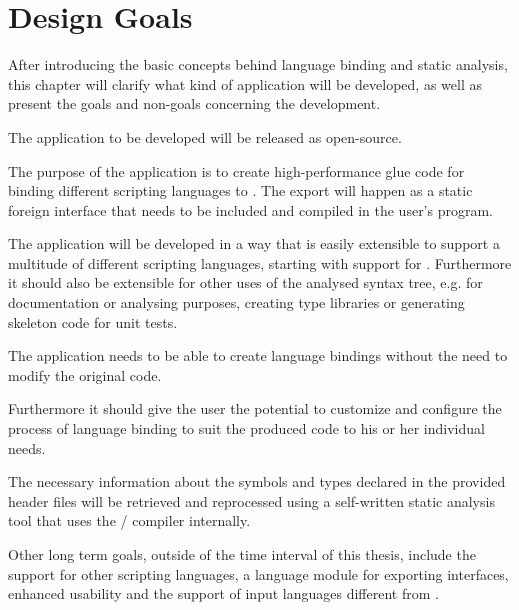\chapter{Design Goals}
\label{chap:DesignGoals}

After introducing the basic concepts behind language binding and static analysis, this chapter will clarify what kind of application will be developed, as well as present the goals and non-goals concerning the development.

The application to be developed will be released as open-source.

The purpose of the application is to create high-performance glue code for binding different scripting languages to . The export will happen as a static foreign interface that needs to be included and compiled in the user's program.

The application will be developed in a way that is easily extensible to support a multitude of different scripting languages, starting with support for . Furthermore it should also be extensible for other uses of the analysed  syntax tree, e.g. for documentation or analysing purposes, creating type libraries or generating skeleton code for unit tests.

The application needs to be able to create language bindings without the need to modify the original code.

Furthermore it should give the user the potential to customize and configure the process of language binding to suit the produced code to his or her individual needs.

The necessary information about the symbols and types declared in the provided  header files will be retrieved and reprocessed using a self-written static analysis tool that uses the  / compiler internally.

Other long term goals, outside of the time interval of this thesis, include the support for other scripting languages, a language module for exporting  interfaces, enhanced usability and the support of input languages different from .